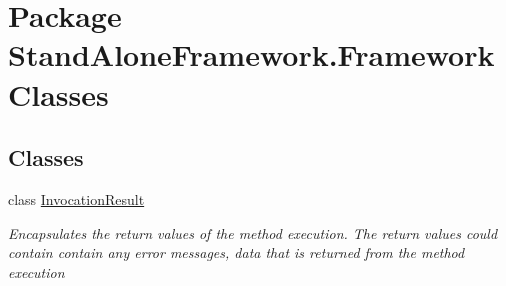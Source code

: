 \hypertarget{namespace_stand_alone_framework_1_1_framework_classes}{\section{Package Stand\+Alone\+Framework.\+Framework\+Classes}
\label{namespace_stand_alone_framework_1_1_framework_classes}
}
\subsection*{Classes}
\begin{DoxyCompactItemize}
\item 
class \hyperlink{class_stand_alone_framework_1_1_framework_classes_1_1_invocation_result}{Invocation\+Result}
\begin{DoxyCompactList}\small\item\em Encapsulates the return values of the method execution. The return values could contain contain any error messages, data that is returned from the method execution \end{DoxyCompactList}\end{DoxyCompactItemize}
